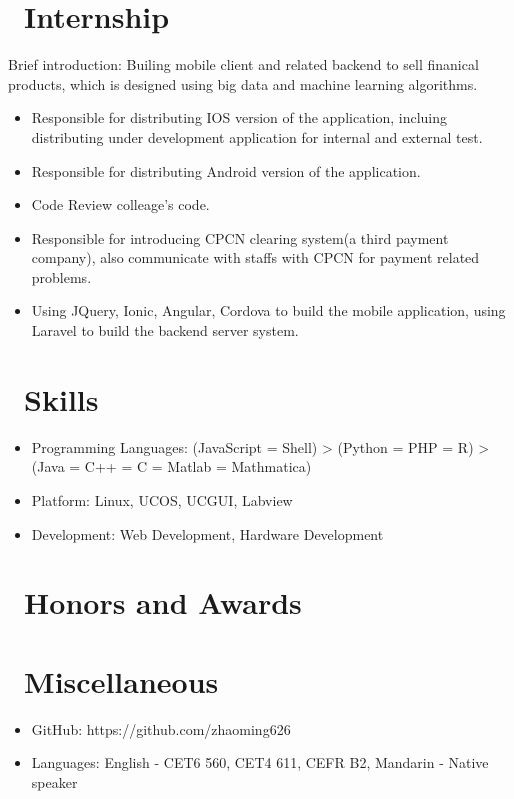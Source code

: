 \documentclass{resume}
\begin{document}
\section{\faUsers\ Internship}
Brief introduction: Builing mobile client and related backend to sell finanical products, which is designed using big data and machine learning algorithms.
\begin{itemize}
  \item Responsible for distributing IOS version of the application, incluing distributing under development application for internal and external test.
  \item Responsible for distributing Android version of the application.
  \item Code Review colleage's code.
  \item Responsible for introducing CPCN clearing system(a third payment company), also communicate with staffs with CPCN for payment related problems.
  \item Using JQuery, Ionic, Angular, Cordova to build the mobile application, using Laravel to build the backend server system.
\end{itemize}


\section{\faCogs\ Skills}
\begin{itemize}[parsep=0.5ex]
  \item Programming Languages: (JavaScript = Shell) > (Python = PHP = R) > (Java = C++ = C = Matlab = Mathmatica)
  \item Platform: Linux, UCOS, UCGUI, Labview
  \item Development: Web Development, Hardware Development
\end{itemize}

\section{\faHeartO\ Honors and Awards}

\section{\faInfo\ Miscellaneous}
\begin{itemize}[parsep=0.5ex]
  \item GitHub: https://github.com/zhaoming626
  \item Languages: English - CET6 560, CET4 611, CEFR B2, Mandarin - Native speaker
\end{itemize}

%
%
\end{document}
